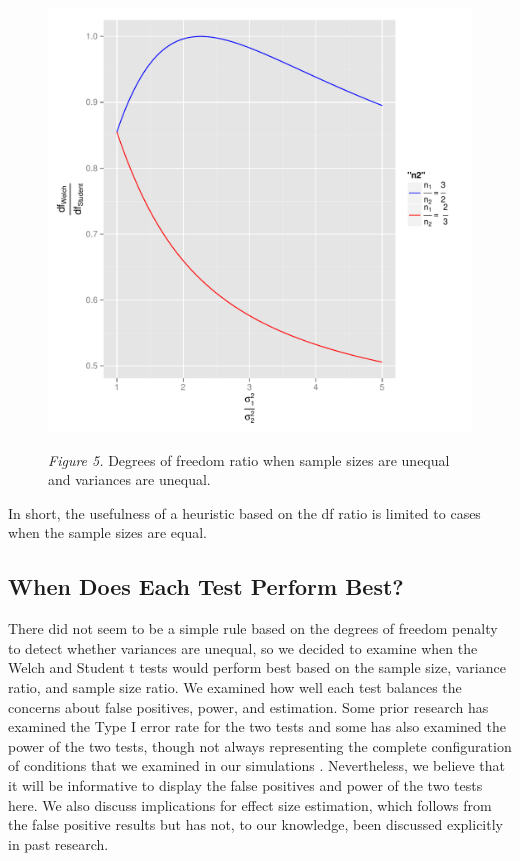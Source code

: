 \documentclass[man,a4paper,noextraspace,apacite]{apa6}\usepackage[]{graphicx}\usepackage[]{color}
\makeatletter
\def\maxwidth{ %
  \ifdim\Gin@nat@width>\linewidth
    \linewidth
  \else
    \Gin@nat@width
  \fi
}
\newenvironment{knitrout}{}{} %
\makeatother
\begin{document}
\begin{figure}
\begin{knitrout}
\color{fgcolor}
\includegraphics[width=\maxwidth]{figure/dfratiosDiffvarsDiffNratios} 

\end{knitrout}
\textit{Figure 5.} Degrees of freedom ratio when sample sizes are unequal and variances are unequal.
\end{figure}
    In short, the usefulness of a heuristic based on the df ratio is limited to cases when the sample sizes are equal. 

\subsection{When Does Each Test Perform Best?}
    There did not seem to be a simple rule based on the degrees of freedom penalty to detect whether variances are unequal, so we decided to examine when the Welch and Student t tests would perform best based on the sample size, variance ratio, and sample size ratio. We examined how well each test balances the concerns about false positives, power, and estimation. Some prior research has examined the Type I error rate for the two tests \cite{Boneau1960, Zimmerman1993, Zimmerman2004, Zimmerman1996, Zimmerman2009} and some has also examined the power of the two tests, though not always representing the complete configuration of conditions that we examined in our simulations \cite{Neuhauser2002, Zimmerman1993}. Nevertheless, we believe that it will be informative to display the false positives and power of the two tests here. We also discuss implications for effect size estimation, which follows from the false positive results but has not, to our knowledge, been discussed explicitly in past research.
\end{document}
